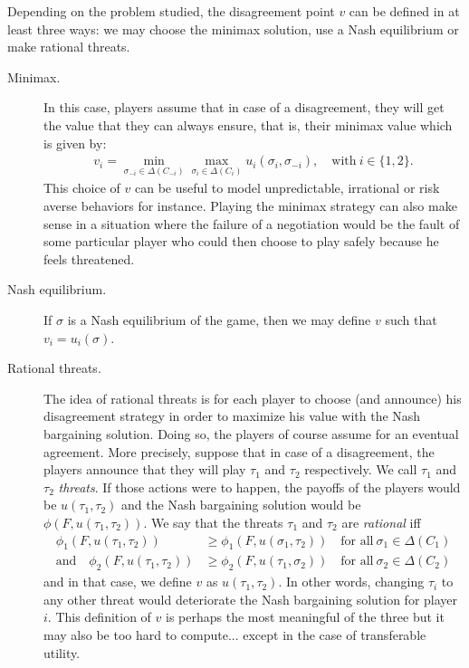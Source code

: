 Depending on the problem studied, the disagreement point $v$ can be defined in at least three ways: we may choose the minimax solution, use a Nash equilibrium or make rational threats.

\begin{description}
	\item[Minimax.] In this case, players assume that in case of a disagreement, they will get the value that they can always ensure, that is, their minimax value which is given by:
	\begin{align*}
		v_i = \min_{\sigma_{-i} \in \Delta(C_{-i})} \max_{\sigma_i \in \Delta(C_i)} u_i(\sigma_i, \sigma_{-i}), \quad \text{with} \ i \in \{1,2\}.
	\end{align*}
	This choice of $v$ can be useful to model unpredictable, irrational or risk averse behaviors for instance. Playing the minimax strategy can also make sense in a situation where the failure of a negotiation would be the fault of some particular player who could then choose to play safely because he feels threatened.
	\item[Nash equilibrium.] If $\sigma$ is a Nash equilibrium of the game, then we may define $v$ such that $v_i = u_i(\sigma)$.
	\item[Rational threats.] The idea of rational threats is for each player to choose (and announce) his disagreement strategy in order to maximize his value with the Nash bargaining solution. Doing so, the players of course assume for an eventual agreement. More precisely, suppose that in case of a disagreement, the players announce that they will play $\tau_1$ and $\tau_2$ respectively. We call $\tau_1$ and $\tau_2$ \emph{threats}. If those actions were to happen, the payoffs of the players would be $u(\tau_1, \tau_2)$ and the Nash bargaining solution would be $\phi(F, u(\tau_1, \tau_2))$. We say that the threats $\tau_1$ and $\tau_2$ are \emph{rational} iff
	\begin{align*}
		\phi_1(F, u(\tau_1, \tau_2)) &\geq \phi_1(F, u(\sigma_1, \tau_2)) \quad \text{for all} \ \sigma_1 \in \Delta(C_1)\\
		\text{and} \quad \phi_2(F, u(\tau_1, \tau_2)) &\geq \phi_2(F, u(\tau_1, \sigma_2)) \quad \text{for all} \ \sigma_2 \in \Delta(C_2)
	\end{align*}
	and in that case, we define $v$ as $u(\tau_1, \tau_2)$. In other words, changing $\tau_i$ to any other threat would deteriorate the Nash bargaining solution for player $i$. This definition of $v$ is perhaps the most meaningful of the three but it may also be too hard to compute... except in the case of transferable utility.
\end{description}



